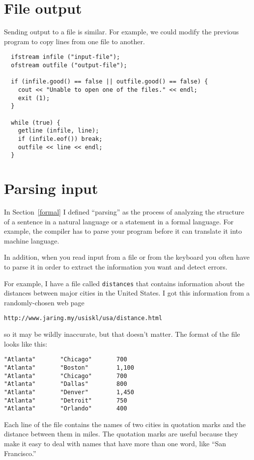 \section{File output}

Sending output to a file is similar.  For example, we could
modify the previous program to copy lines from one file to
another.

\begin{verbatim}
  ifstream infile ("input-file");
  ofstream outfile ("output-file");

  if (infile.good() == false || outfile.good() == false) {
    cout << "Unable to open one of the files." << endl;
    exit (1);
  }

  while (true) {
    getline (infile, line);
    if (infile.eof()) break;
    outfile << line << endl;
  }
\end{verbatim}

\section{Parsing input}
\label{parsing}

In Section~\ref{formal} I defined ``parsing'' as the process of
analyzing the structure of a sentence in a natural language or a
statement in a formal language.  For example, the compiler has to
parse your program before it can translate it into machine language.

In addition, when you read input from a file or from the keyboard
you often have to parse it in order to extract the information
you want and detect errors.

For example, I have a file called {\tt distances} that contains
information about the distances between major cities in the
United States.  I got this information from a randomly-chosen
web page

\begin{verbatim}
http://www.jaring.my/usiskl/usa/distance.html
\end{verbatim}
%
so it may be wildly inaccurate, but that doesn't matter.  The
format of the file looks like this:

\begin{verbatim}
"Atlanta"       "Chicago"       700
"Atlanta"       "Boston"        1,100
"Atlanta"       "Chicago"       700
"Atlanta"       "Dallas"        800
"Atlanta"       "Denver"        1,450
"Atlanta"       "Detroit"       750
"Atlanta"       "Orlando"       400
\end{verbatim}
%
Each line of the file contains the names of two cities in quotation
marks and the distance between them in miles.  The quotation marks
are useful because they make it easy to deal with names that have
more than one word, like ``San Francisco.''

